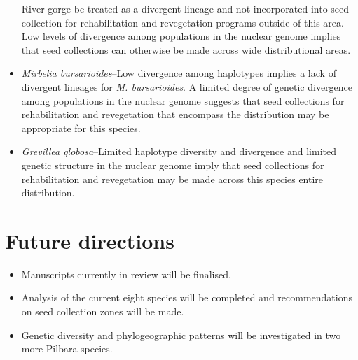 \documentclass[version=last,
    paper=a4, %
    10pt, %
    usenames,
    dvipsnames,
    oneside, %
    headings=openany, %
    DIV=15 %
]{scrbook}
\begin{document}
\begin{itemize}
  River gorge be treated as a divergent lineage and not incorporated
  into seed collection for rehabilitation and revegetation programs
  outside of this area. Low levels of divergence among populations in
  the nuclear genome implies that seed collections can otherwise be made
  across wide distributional areas.
\item
  \emph{Mirbelia bursarioides}--Low divergence among haplotypes implies
  a lack of divergent lineages for \emph{M. bursarioides}. A limited
  degree of genetic divergence among populations in the nuclear genome
  suggests that seed collections for rehabilitation and revegetation
  that encompass the distribution may be appropriate for this species.
\item
  \emph{Grevillea globosa}--Limited haplotype diversity and divergence
  and limited genetic structure in the nuclear genome imply that seed
  collections for rehabilitation and revegetation may be made across
  this species entire distribution.
\end{itemize}



\section*{Future directions}
\begin{itemize}
\itemsep1pt\parskip0pt
\item
  Manuscripts currently in review will be finalised.
\item
  Analysis of the current eight species will be completed and
  recommendations on seed collection zones will be made.
\item
  Genetic diversity and phylogeographic patterns will be investigated in
  two more Pilbara species.
\end{itemize}



\end{document}
